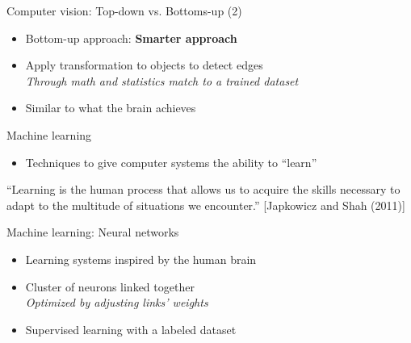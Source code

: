 \documentclass{beamer}
\begin{document}
\begin{frame}{Computer vision: Top-down vs. Bottoms-up (2)}
    \begin{itemize}
        \item Bottom-up approach: \textbf{Smarter approach} \\
        \item Apply transformation to objects to detect edges \\
            \hspace{0.27cm}\textit{Through math and statistics match to a trained dataset} \\
        \item Similar to what the brain achieves

\end{itemize}
    \end{frame}

\begin{frame}{Machine learning}
    \begin{itemize}
        \item Techniques to give computer systems the ability to ``learn''
    \end{itemize}
    \vspace{1cm}

    ``Learning is the human process that allows us to acquire the skills necessary to adapt to the multitude of situations we encounter.'' [Japkowicz and Shah (2011)]

\end{frame}

\begin{frame}{Machine learning: Neural networks}
    \begin{itemize}
        \item Learning systems inspired by the human brain
        \item Cluster of neurons linked together \\
            \hspace{0.27cm}\textit{Optimized by adjusting links' weights}
        \item Supervised learning with a labeled dataset
    \end{itemize}
\end{frame}
\end{document}
